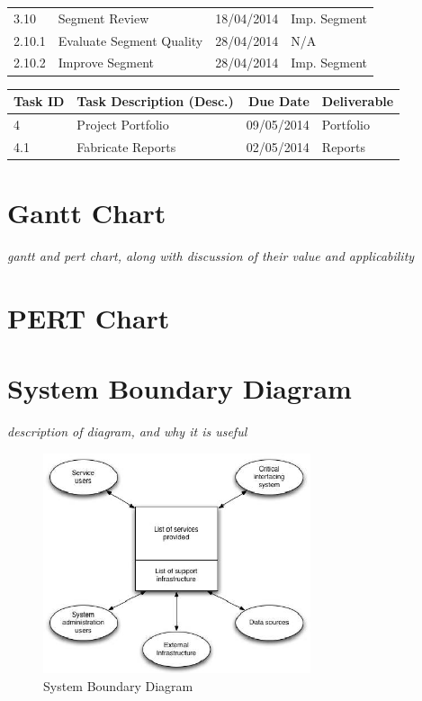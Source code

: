 \begin{tabular}{llrl}
    3.10     & Segment Review               & 18/04/2014  & Imp. Segment      \\
    2.10.1   & Evaluate Segment Quality     & 28/04/2014  & N/A               \\
    2.10.2   & Improve Segment              & 28/04/2014  & Imp. Segment      \\
    
    \bottomrule
\end{tabular}

\pagebreak

\begin{tabular}{llrl}
    
    \toprule
    
    Task ID  & Task Description (Desc.)     & Due Date    & Deliverable       \\
    
    \midrule
    
    4        & Project Portfolio            & 09/05/2014  & Portfolio         \\
    4.1      & Fabricate Reports            & 02/05/2014  & Reports           \\
    
    \bottomrule

\end{tabular}

\pagebreak

\section{Gantt Chart}
\textit{gantt and pert chart, along with discussion of their value and
applicability}


\section{PERT Chart}


\section{System Boundary Diagram}
\textit{description of diagram, and why it is useful}
\begin{figure}[h]
    \centering
    \includegraphics[width=0.7\textwidth]{images/requirements/system_boundary_diagram.png}
    \caption{System Boundary Diagram}
    \label{fig:sys_boundary_diag}
\end{figure}
